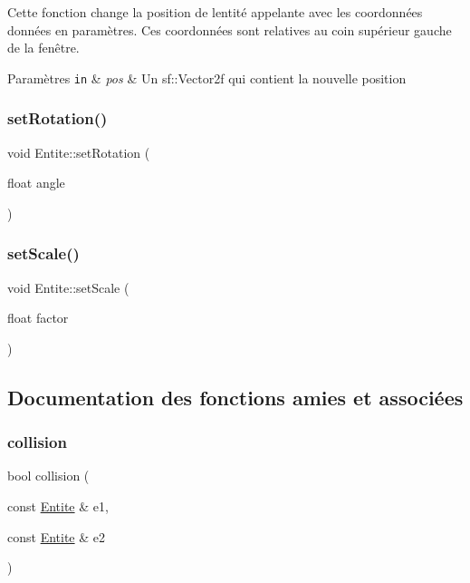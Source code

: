 Cette fonction change la position de l\textquotesingle{}entité appelante avec les coordonnées données en paramètres. Ces coordonnées sont relatives au coin supérieur gauche de la fenêtre. 
\begin{DoxyParams}[1]{Paramètres}
\mbox{\tt in}  & {\em pos} & Un {\ttfamily sf\+::\+Vector2f} qui contient la nouvelle position \\
\hline
\end{DoxyParams}
\mbox{\label{class_entite_acefaaf63dfe743c73fba1e6143015827}} 
\subsubsection{\texorpdfstring{set\+Rotation()}{setRotation()}}
{\footnotesize\ttfamily void Entite\+::set\+Rotation (\begin{DoxyParamCaption}\item[{float}]{angle }\end{DoxyParamCaption})}

\mbox{\label{class_entite_a3cfd095f6712461cb8c9baa2f6955088}} 
\subsubsection{\texorpdfstring{set\+Scale()}{setScale()}}
{\footnotesize\ttfamily void Entite\+::set\+Scale (\begin{DoxyParamCaption}\item[{float}]{factor }\end{DoxyParamCaption})}



\subsection{Documentation des fonctions amies et associées}
\mbox{\label{class_entite_ac85cf277aaeb8a314734c1fa5f35e3be}} 
\subsubsection{\texorpdfstring{collision}{collision}}
{\footnotesize\ttfamily bool collision (\begin{DoxyParamCaption}\item[{const \hyperlink{class_entite}{Entite} \&}]{e1,  }\item[{const \hyperlink{class_entite}{Entite} \&}]{e2 }\end{DoxyParamCaption})\hspace{0.3cm}{\ttfamily [friend]}}



